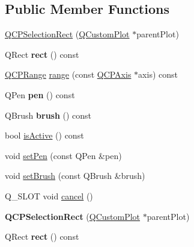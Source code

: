 \subsection*{Public Member Functions}
\begin{DoxyCompactItemize}
\item 
\hyperlink{class_q_c_p_selection_rect_ade6ee59fabcc585a1e281eb527b01867}{Q\+C\+P\+Selection\+Rect} (\hyperlink{class_q_custom_plot}{Q\+Custom\+Plot} $\ast$parent\+Plot)
\item 
\mbox{\label{class_q_c_p_selection_rect_a3812115ae4dfe2855bf1e58331c14805}} 
Q\+Rect {\bfseries rect} () const
\item 
\hyperlink{class_q_c_p_range}{Q\+C\+P\+Range} \hyperlink{class_q_c_p_selection_rect_a23ab082ffa04be1dbf9afb9e633ab815}{range} (const \hyperlink{class_q_c_p_axis}{Q\+C\+P\+Axis} $\ast$axis) const
\item 
\mbox{\label{class_q_c_p_selection_rect_ab4229f8faeaffba9617d2e6c4779b765}} 
Q\+Pen {\bfseries pen} () const
\item 
\mbox{\label{class_q_c_p_selection_rect_a9669c77c5796dea9dc089a088d50ebfb}} 
Q\+Brush {\bfseries brush} () const
\item 
bool \hyperlink{class_q_c_p_selection_rect_ad27c1569c6ea8fa48e24b81e2a302df3}{is\+Active} () const
\item 
void \hyperlink{class_q_c_p_selection_rect_ada20b7fb1b2dcbe50523262636b06963}{set\+Pen} (const Q\+Pen \&pen)
\item 
void \hyperlink{class_q_c_p_selection_rect_ab0c66f1484418782efa01f4153611080}{set\+Brush} (const Q\+Brush \&brush)
\item 
Q\+\_\+\+S\+L\+OT void \hyperlink{class_q_c_p_selection_rect_af67bc58f4f5ce9a4dc420b9c42de235a}{cancel} ()
\item 
\mbox{\label{class_q_c_p_selection_rect_ade6ee59fabcc585a1e281eb527b01867}} 
{\bfseries Q\+C\+P\+Selection\+Rect} (\hyperlink{class_q_custom_plot}{Q\+Custom\+Plot} $\ast$parent\+Plot)
\item 
\mbox{\label{class_q_c_p_selection_rect_a3812115ae4dfe2855bf1e58331c14805}} 
Q\+Rect {\bfseries rect} () const
\item 

\end{DoxyCompactItemize}
